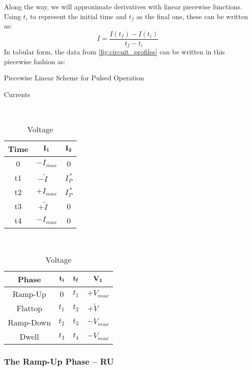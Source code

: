 Along the way, we will approximate derivatives with linear piecewise functions. Using $t_i$ to represent the initial time and $t_f$ as the final one, these can be written as:
\begin{equation}
	\dot I = \frac{ I(t_f) - I(t_i) }{t_f - t_i}
\end{equation}
In tabular form, the data from \cref{fig:circuit_profiles} can be written in this piecewise fashion as:

\begin{table}[h!]
\centering	
\caption{Piecewise Linear Scheme for Pulsed Operation}
\hfill
\begin{subtable}[t]{0.4\textwidth}
\centering	
\caption{Currents} ~\\
\begin{tabular}{ c|c|c } 

\textbf{Time} & {$\bold{I_1}$} & {$\bold{I_2}$} \\
\hline
0 & $-I_{max}$ & 0 \\ 
t1 & $-\tilde I \ \ \ \,\, $ & $I_P^{\,*} $ \\ 
t2 & $+I_{max}$ & $I_P^{\,*}$ \\ 
t3 & $+\tilde I \ \ \ \,\, $ & 0 \\ 
t4 & $-I_{max}$ & 0 \\ 
\end{tabular}
\end{subtable}
\hfill
\begin{subtable}[t]{0.5\textwidth}
\centering	
\caption{Voltage} ~\\
\begin{tabular}{ c|c|c|c } 
\textbf{Phase} & $\bold{t_i}$ & $\bold{t_f}$ & $\bold{V_1}$ \\
\hline
Ramp-Up & 0 & $t_1$ & $+V_{max}$ \\ 
Flattop & $t_1$ & $t_2$ & $+ \tilde V$ \ \,\,\, \\ 
Ramp-Down & $t_2$ & $t_3$ & ${-V}_{max}$ \\ 
Dwell & $t_3$ & $t_4$ & ${-V}_{max}$ \\ 
\end{tabular}
\end{subtable}
\hfill
\hfill
\end{table}


\subsubsection{The Ramp-Up Phase -- RU}

